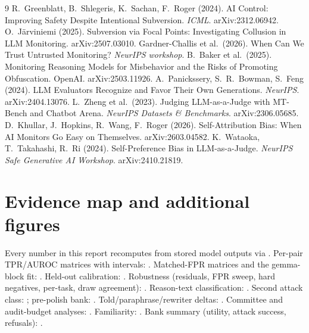 \documentclass[11pt]{article}
\begin{document}
\begin{thebibliography}{9}\small
{} R.~Greenblatt, B.~Shlegeris, K.~Sachan, F.~Roger (2024). AI Control:
Improving Safety Despite Intentional Subversion. \emph{ICML}. arXiv:2312.06942.
 O.~J\"arviniemi (2025). Subversion via Focal Points: Investigating
Collusion in LLM Monitoring. arXiv:2507.03010.
 Gardner-Challis et al.\ (2026). When Can We Trust Untrusted
Monitoring? \emph{NeurIPS workshop}.
 B.~Baker et al.\ (2025). Monitoring Reasoning Models for Misbehavior and the
Risks of Promoting Obfuscation. OpenAI. arXiv:2503.11926.
 A.~Panickssery, S.~R.~Bowman, S.~Feng (2024). LLM Evaluators
Recognize and Favor Their Own Generations. \emph{NeurIPS}. arXiv:2404.13076.
 L.~Zheng et al.\ (2023). Judging LLM-as-a-Judge with MT-Bench and Chatbot
Arena. \emph{NeurIPS Datasets \& Benchmarks}. arXiv:2306.05685.
 D.~Khullar, J.~Hopkins, R.~Wang, F.~Roger (2026). Self-Attribution Bias:
When AI Monitors Go Easy on Themselves. arXiv:2603.04582.
 K.~Wataoka, T.~Takahashi, R.~Ri (2024). Self-Preference Bias in
LLM-as-a-Judge. \emph{NeurIPS Safe Generative AI Workshop}. arXiv:2410.21819.
\end{thebibliography}

\appendix
\setcounter{figure}{0}
\section{Evidence map and additional figures}\label{app:evidence}
Every number in this report recomputes from stored model outputs via . Per-pair TPR/AUROC
matrices with intervals: . Matched-FPR matrices and the gemma-block fit:
. Held-out calibration: . Robustness (residuals, FPR
sweep, hard negatives, per-task, draw agreement): . Reason-text classification:
. Second attack class: ; pre-polish bank:
. Told/paraphrase/rewriter deltas: .
Committee and audit-budget analyses: . Familiarity:
{\small{}}. Bank summary (utility, attack success, refusals): .
\end{document}
